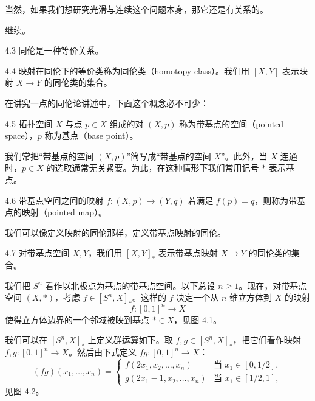 当然，如果我们想研究光滑与连续这个问题本身，那它还是有关系的。

继续。

\begin{proposition}{4.3}
同伦是一种等价关系。
\end{proposition}

\begin{definition}{4.4}
映射在同伦下的等价类称为同伦类（homotopy class）。我们用 $[X,Y]$ 表示映射 $X\to Y$ 的同伦类的集合。
\end{definition}

在讲究一点的同伦论讲述中，下面这个概念必不可少：

\begin{definition}{4.5}
拓扑空间 $X$ 与点 $p\in X$ 组成的对 $(X,p)$ 称为带基点的空间（pointed space），$p$ 称为基点（base point）。
\end{definition}

我们常把“带基点的空间 $(X,p)$”简写成“带基点的空间 $X$”。此外，当 $X$ 连通时，$p\in X$ 的选取通常无关紧要。为此，在这种情形下我们常用记号 $\ast$ 表示基点。

\begin{definition}{4.6}
带基点空间之间的映射 $f:(X,p)\to(Y,q)$ 若满足 $f(p)=q$，则称为带基点的映射（pointed map）。
\end{definition}

我们可以像定义映射的同伦那样，定义带基点映射的同伦。

\begin{definition}{4.7}
对带基点空间 $X,Y$，我们用 $[X,Y]_\ast$ 表示带基点映射 $X\to Y$ 的同伦类的集合。
\end{definition}

我们把 $S^n$ 看作以北极点为基点的带基点空间。以下总设 $n\ge1$。现在，对带基点空间 $(X,\ast)$，考虑 $f\in[S^n,X]_\ast$。这样的 $f$ 决定一个从 $n$ 维立方体到 $X$ 的映射
\begin{equation}
f:[0,1]^n\to X
\tag{4.1}
\end{equation}
使得立方体边界的一个邻域被映到基点 $\ast\in X$，见图 4.1。

我们可以在 $[S^n,X]_\ast$ 上定义群运算如下。取 $f,g\in[S^n,X]_\ast$，把它们看作映射 $f,g:[0,1]^n\to X$。然后由下式定义 $fg:[0,1]^n\to X$：
\begin{equation}
(fg)(x_1,\dots,x_n)=
\begin{cases}
f(2x_1,x_2,\dots,x_n) & \text{当 } x_1\in[0,1/2],\\
g(2x_1-1,x_2,\dots,x_n) & \text{当 } x_1\in[1/2,1],
\end{cases}
\tag{4.2}
\end{equation}
见图 4.2。

